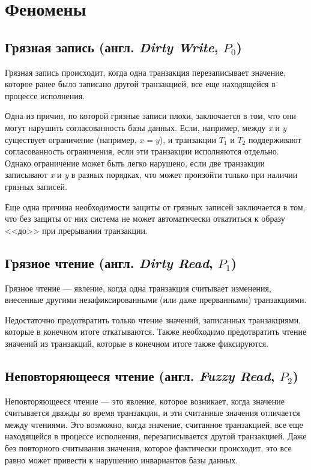 \documentclass[12pt,  openany]{book}
\begin{document}
\section{Феномены}
\subsection{Грязная запись (англ.  \textit{Dirty Write},  $P_0$) \cite{CritiqueANSI_SQL}}
Грязная запись происходит, когда одна транзакция перезаписывает значение, которое ранее было записано другой транзакцией, все еще находящейся в процессе исполнения.
\par Одна из причин, по которой грязные записи плохи, заключается в том, что они могут нарушить согласованность базы данных. Если, например, между \textit{x} и \textit{y} существует ограничение (например, $x = y$), и транзакции $T_1$ и $T_2$ поддерживают согласованность ограничения, если эти транзакции исполняются отдельно. Однако ограничение может быть легко нарушено, если две транзакции записывают \textit{x} и \textit{y} в разных порядках, что может произойти только при наличии грязных записей.
\par Еще одна причина необходимости защиты от грязных записей заключается в том, что без защиты от них система не может автоматически откатиться к образу <<до>> при прерывании транзакции.

\subsection{Грязное чтение (англ. \textit{Dirty Read}, $P_1$)}
Грязное чтение --- явление, когда одна транзакция считывает изменения, внесенные другими незафиксированными (или даже прерванными) транзакциями. \cite{sookocheff}
\par Недостаточно предотвратить только чтение значений, записанных транзакциями, которые в конечном итоге откатываются. Также необходимо предотвратить чтение значений из транзакций, которые в конечном итоге также фиксируются.  \cite{CritiqueANSI_SQL}

\subsection{Неповторяющееся чтение (англ. \textit{Fuzzy Read}, $P_2$)}
Неповторяющееся чтение --- это явление, которое возникает, когда значение считывается дважды во время транзакции, и эти считанные значения отличается между чтениями.  Это возможно, когда значение, считанное транзакцией, все еще находящейся в процессе исполнения, перезаписывается другой транзакцией. Даже без повторного считывания значения, которое фактически происходит, это все равно может привести к нарушению инвариантов базы данных.  \cite{CritiqueANSI_SQL}
\end{document}
